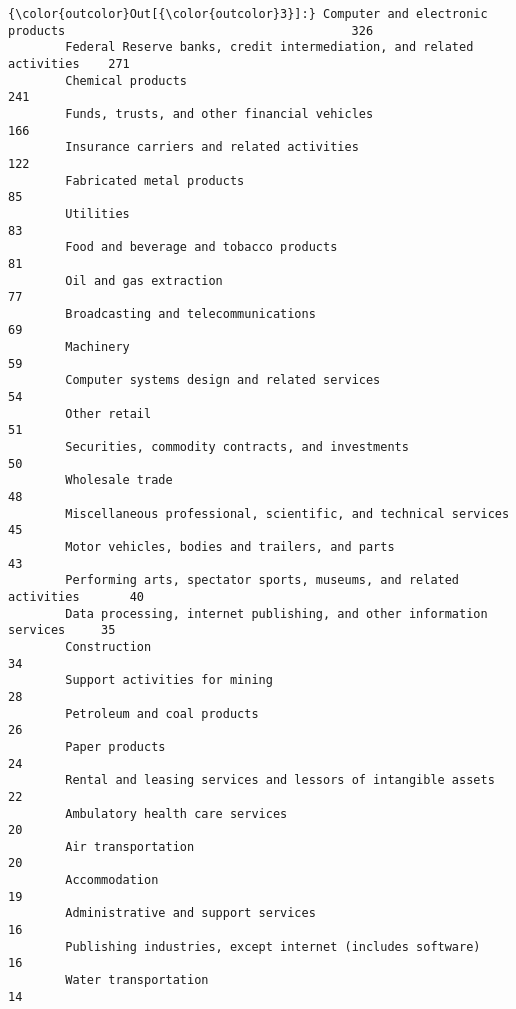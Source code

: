 \documentclass[11pt]{article}
\begin{document}
\begin{Verbatim}[commandchars=\\\{\}]
{\color{outcolor}Out[{\color{outcolor}3}]:} Computer and electronic products                                        326
        Federal Reserve banks, credit intermediation, and related activities    271
        Chemical products                                                       241
        Funds, trusts, and other financial vehicles                             166
        Insurance carriers and related activities                               122
        Fabricated metal products                                                85
        Utilities                                                                83
        Food and beverage and tobacco products                                   81
        Oil and gas extraction                                                   77
        Broadcasting and telecommunications                                      69
        Machinery                                                                59
        Computer systems design and related services                             54
        Other retail                                                             51
        Securities, commodity contracts, and investments                         50
        Wholesale trade                                                          48
        Miscellaneous professional, scientific, and technical services           45
        Motor vehicles, bodies and trailers, and parts                           43
        Performing arts, spectator sports, museums, and related activities       40
        Data processing, internet publishing, and other information services     35
        Construction                                                             34
        Support activities for mining                                            28
        Petroleum and coal products                                              26
        Paper products                                                           24
        Rental and leasing services and lessors of intangible assets             22
        Ambulatory health care services                                          20
        Air transportation                                                       20
        Accommodation                                                            19
        Administrative and support services                                      16
        Publishing industries, except internet (includes software)               16
        Water transportation                                                     14

\end{Verbatim}
\end{document}
